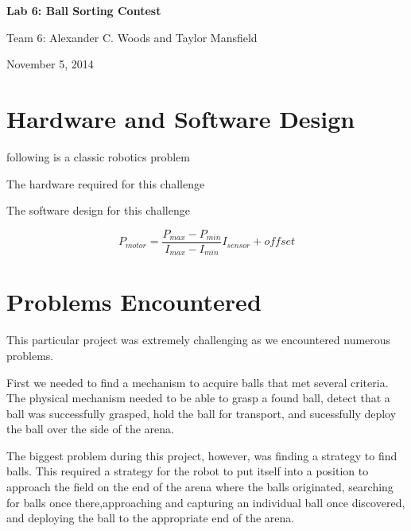 \documentclass[journal]{../IEEEtran}
\begin{document}
\begin{titlepage}
    \vspace*{\fill}
    \begin{center}
      {\LARGE \bf Lab 6: Ball Sorting Contest}

      {Team 6: Alexander  C. Woods and Taylor Mansfield}

      November 5, 2014
    \end{center}
    \vspace*{\fill}
  \end{titlepage}


\section{Hardware and Software Design}\label{S.design}
 following is a classic robotics problem


The hardware required for this challenge

The software design for this challenge 

\begin{equation}\label{E.motor_speed}
    P_{motor} = \frac{P_{max}-P_{min}}{I_{max}-I_{min}}I_{sensor} + offset
\end{equation}

\section{Problems Encountered}\label{S.problems}
This particular project was extremely challenging as we encountered numerous problems. 

First we needed to find a mechanism to acquire balls that met several criteria. The physical mechanism needed to be able to grasp a found ball, detect that a ball was successfully grasped, hold the ball for transport, and sucessfully deploy the ball over the side of the arena. 

The biggest problem during this project, however, was finding a strategy to find balls. This required a strategy for the robot to put itself into a position to approach the field on the end of the arena where the balls originated, searching for balls once there,approaching and capturing an individual ball once discovered, and deploying the ball to the appropriate end of the arena. 
\end{document}
